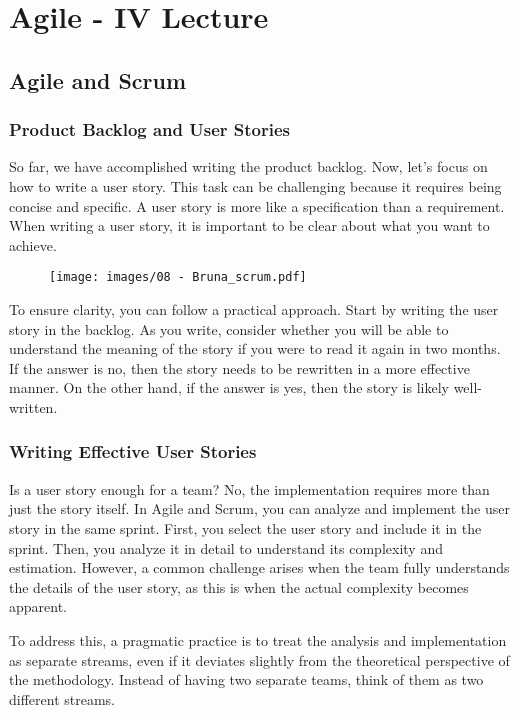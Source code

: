 \section{Agile - IV Lecture}

\subsection{Agile and Scrum}

\subsubsection{Product Backlog and User Stories}

So far, we have accomplished writing the product backlog. Now, let's
focus on how to write a user story. This task can be challenging because
it requires being concise and specific. A user story is more like a
specification than a requirement. When writing a user story, it is
important to be clear about what you want to achieve.

\begin{figure}[!h]
  \centering
  \texttt{[image: images/08 - Bruna\_scrum.pdf]}
\end{figure}

To ensure clarity, you can follow a practical approach. Start by writing
the user story in the backlog. As you write, consider whether you will
be able to understand the meaning of the story if you were to read it
again in two months. If the answer is no, then the story needs to be
rewritten in a more effective manner. On the other hand, if the answer
is yes, then the story is likely well-written.

\subsubsection{Writing Effective User Stories}

Is a user story enough for a team? No, the implementation requires more
than just the story itself. In Agile and Scrum, you can analyze and
implement the user story in the same sprint. First, you select the user
story and include it in the sprint. Then, you analyze it in detail to
understand its complexity and estimation. However, a common challenge
arises when the team fully understands the details of the user story, as
this is when the actual complexity becomes apparent.

To address this, a pragmatic practice is to treat the analysis and
implementation as separate streams, even if it deviates slightly from
the theoretical perspective of the methodology. Instead of having two
separate teams, think of them as two different streams.


